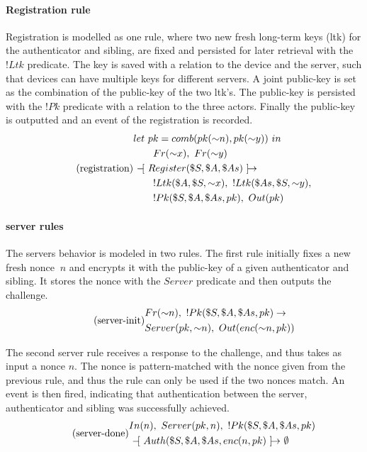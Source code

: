\paragraph{Registration rule}
Registration is modelled as one rule, where two new fresh long-term keys (ltk) for the \gls{authenticator} and \gls{sibling}, are fixed and persisted for later retrieval with the $!Ltk$ predicate. The key is saved with a relation to the device and the server, such that devices can have multiple keys for different \glspl{server}. A joint public-key is set as the combination of the public-key of the two ltk's. The public-key is persisted with the $!Pk$ predicate with a relation to the three actors. Finally the public-key is outputted and an event of the registration is recorded.
\begin{equation} \tag{registration}
\begin{split}
& \plet{pk = comb(pk({\sim}n),  pk({\sim}y))}\\
& \qquad Fr({\sim}x),~Fr({\sim}y)\\
& \ifarrow[Register(\$S, \$A, \$As)]\\
&\qquad    !Ltk(\$A, \$S, {\sim}x),~!Ltk(\$As, \$S, {\sim}y),\\
&\qquad    !Pk(\$S, \$A, \$As, pk),~Out(pk)
\end{split}
\end{equation}



\paragraph{\gls{server} rules}
The \glspl{server} behavior is modeled in two rules. The first rule initially fixes a new fresh nonce $~n$ and encrypts it with the public-key of a given \gls{authenticator} and \gls{sibling}. It stores the nonce with the $Server$ predicate and then outputs the challenge.
\begin{equation} \tag{server-init}
\begin{split}
& Fr({\sim}n),~!Pk(\$S, \$A, \$As, pk) \ifarrow[]\\
& Server(pk, {\sim}n),~Out(enc({\sim}n,pk))
\end{split}
\end{equation}


The second server rule receives a response to the challenge, and thus takes as input a nonce $n$. The nonce is pattern-matched with the nonce given from the previous rule, and thus the rule can only be used if the two nonces match. An event is then fired, indicating that  authentication between the \gls{server}, \gls{authenticator} and \gls{sibling} was successfully achieved.
\begin{equation} \tag{server-done}
\begin{split}
& In(n),~Server(pk, n),~!Pk(\$S, \$A, \$As, pk) \\
& \ifarrow[ Auth(\$S, \$A, \$As, enc(n,pk) ] \emptyset 
\end{split}
\end{equation}

